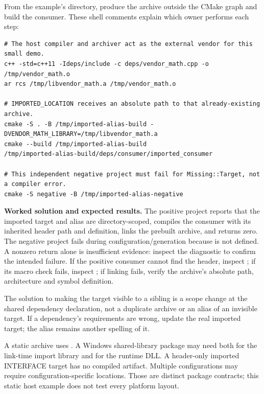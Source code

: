 From the example's directory, produce the archive outside the CMake graph and build the consumer. These shell comments explain which owner performs each step:

\begin{verbatim}
# The host compiler and archiver act as the external vendor for this small demo.
c++ -std=c++11 -Ideps/include -c deps/vendor_math.cpp -o /tmp/vendor_math.o
ar rcs /tmp/libvendor_math.a /tmp/vendor_math.o

# IMPORTED_LOCATION receives an absolute path to that already-existing archive.
cmake -S . -B /tmp/imported-alias-build -DVENDOR_MATH_LIBRARY=/tmp/libvendor_math.a
cmake --build /tmp/imported-alias-build
/tmp/imported-alias-build/deps/consumer/imported_consumer

# This independent negative project must fail for Missing::Target, not a compiler error.
cmake -S negative -B /tmp/imported-alias-negative
\end{verbatim}

\textbf{Worked solution and expected results.} The positive project reports that the imported target and alias are directory-scoped, compiles the consumer with its inherited header path and definition, links the prebuilt archive, and returns zero. The negative project fails during configuration/generation because  is not defined. A nonzero return alone is insufficient evidence: inspect the diagnostic to confirm the intended failure. If the positive consumer cannot find the header, inspect ; if its macro check fails, inspect ; if linking fails, verify the archive's absolute path, architecture and symbol definition.

The solution to making the target visible to a sibling is a scope change at the shared dependency declaration, not a duplicate archive or an alias of an invisible target. If a dependency's requirements are wrong, update the real imported target; the alias remains another spelling of it.

A static archive uses . A Windows shared-library package may need both  for the link-time import library and  for the runtime DLL. A header-only imported INTERFACE target has no compiled artifact. Multiple configurations may require configuration-specific locations. Those are distinct package contracts; this static host example does not test every platform layout.

